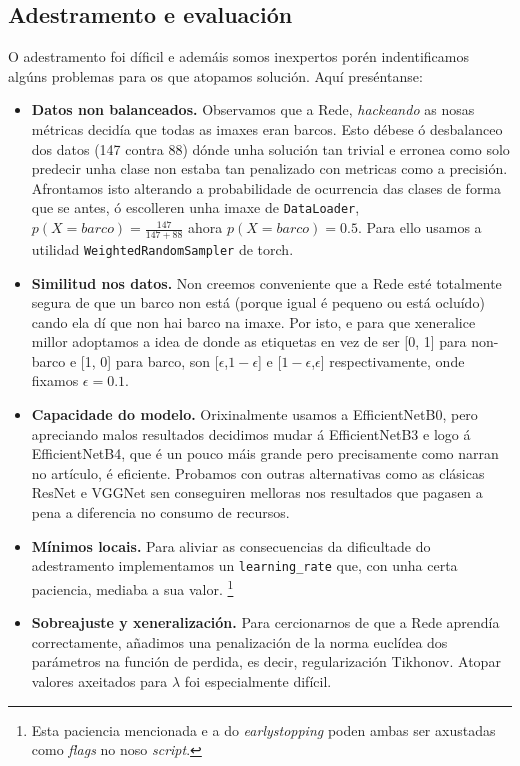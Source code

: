 \documentclass{article}
\begin{document}
\subsection{Adestramento e evaluación}

O adestramento foi díficil e ademáis somos inexpertos porén indentificamos algúns problemas para os que atopamos solución. Aquí preséntanse:
\begin{itemize}
	\item \textbf{Datos non balanceados.} Observamos que a Rede, \emph{hackeando} as nosas métricas decidía que todas as imaxes eran barcos. Esto débese ó desbalanceo dos datos (147 contra 88) dónde unha solución tan trivial e erronea como solo predecir unha clase non estaba tan penalizado con metricas como a precisión. Afrontamos isto alterando a probabilidade de ocurrencia das clases de forma que se antes, ó escolleren unha imaxe de \texttt{DataLoader}, $p(X=barco) = \frac{147}{147+88}$ ahora $p(X = barco) = 0.5$. Para ello usamos a utilidad \texttt{WeightedRandomSampler} de torch.
	\item \textbf{Similitud nos datos.} Non creemos conveniente que a Rede esté totalmente segura de que un barco non está (porque igual é pequeno ou está ocluído) cando ela dí que non hai barco na imaxe. Por isto, e para que xeneralice millor adoptamos a idea de \cite{DBLP:journals/corr/SzegedyVISW15} donde as etiquetas en vez de ser [0, 1] para non-barco e [1, 0] para barco, son [$\epsilon$,$1 - \epsilon$] e [$1- \epsilon$,$\epsilon$] respectivamente, onde fixamos $\epsilon = 0.1$.
	\item \textbf{Capacidade do modelo.} Orixinalmente usamos a EfficientNetB0, pero apreciando malos resultados decidimos mudar á EfficientNetB3 e logo á EfficientNetB4, que é un pouco máis grande pero precisamente como narran no artículo, é eficiente. Probamos con outras alternativas como as clásicas ResNet e VGGNet sen conseguiren melloras nos resultados que pagasen a pena a diferencia no consumo de recursos.
	\item \textbf{Mínimos locais.} Para aliviar as consecuencias da dificultade do adestramento implementamos un \texttt{learning\_rate} que, con unha certa paciencia, mediaba a sua valor. \footnote{Esta paciencia mencionada e a do \emph{earlystopping} poden ambas ser axustadas como \emph{flags} no noso \emph{script}.}
	\item \textbf{Sobreajuste y xeneralización.} Para cercionarnos de que a Rede aprendía correctamente, añadimos una penalización de la norma euclídea dos parámetros na función de perdida, es decir, regularización Tikhonov. Atopar valores axeitados para $\lambda$ foi especialmente difícil.
\end{itemize}
\end{document}
